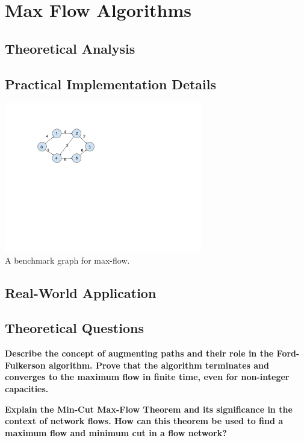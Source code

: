 \documentclass[12pt]{amsart}
\begin{document}
\section{Max Flow Algorithms}

\subsection{Theoretical Analysis}

\subsection{Practical Implementation Details}

\begin{center}
    \includegraphics[width=0.65\textwidth]{graph} \\
    A benchmark graph for max-flow. \\
    \vskip 1cm
\end{center}

\subsection{Real-World Application}

\subsection{Theoretical Questions}

    \textbf{Describe the concept of augmenting paths and
    their role in the Ford-Fulkerson algorithm. Prove that the
    algorithm terminates and converges to the maximum flow in
    finite time, even for non-integer capacities.}

    \textbf{Explain the Min-Cut Max-Flow Theorem and its
    significance in the context of network flows. How can this
    theorem be used to find a maximum flow and minimum cut in a
    flow network?}
\end{document}
